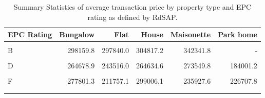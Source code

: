 \begin{table}[!h]
\centering
\caption{Summary Statistics of average transaction price by property type and EPC rating as defined by RdSAP.}
\begin{tabular}{lrrrrr}
\toprule
EPC Rating & Bungalow & Flat & House & Maisonette & Park home\\
\midrule
\cellcolor{gray!10}{A} & \cellcolor{gray!10}{297144.7} & \cellcolor{gray!10}{328078.0} & \cellcolor{gray!10}{366825.9} & \cellcolor{gray!10}{384231.6} & \cellcolor{gray!10}{-}\\
B & 298159.8 & 297840.0 & 304817.2 & 342341.8 & -\\
\cellcolor{gray!10}{C} & \cellcolor{gray!10}{279565.3} & \cellcolor{gray!10}{228881.0} & \cellcolor{gray!10}{264755.1} & \cellcolor{gray!10}{254608.2} & \cellcolor{gray!10}{278219.6}\\
D & 264678.9 & 243516.0 & 264634.6 & 273549.8 & 184001.2\\
\cellcolor{gray!10}{E} & \cellcolor{gray!10}{274003.5} & \cellcolor{gray!10}{238571.2} & \cellcolor{gray!10}{283038.0} & \cellcolor{gray!10}{269317.8} & \cellcolor{gray!10}{246575.5}\\
\addlinespace
F & 277801.3 & 211757.1 & 299006.1 & 235927.6 & 226707.8\\
\cellcolor{gray!10}{G} & \cellcolor{gray!10}{256178.3} & \cellcolor{gray!10}{206546.6} & \cellcolor{gray!10}{240768.1} & \cellcolor{gray!10}{218924.4} & \cellcolor{gray!10}{291646.8}\\
\bottomrule
\label{Descriptive_Price}
\end{tabular}
\end{table}
